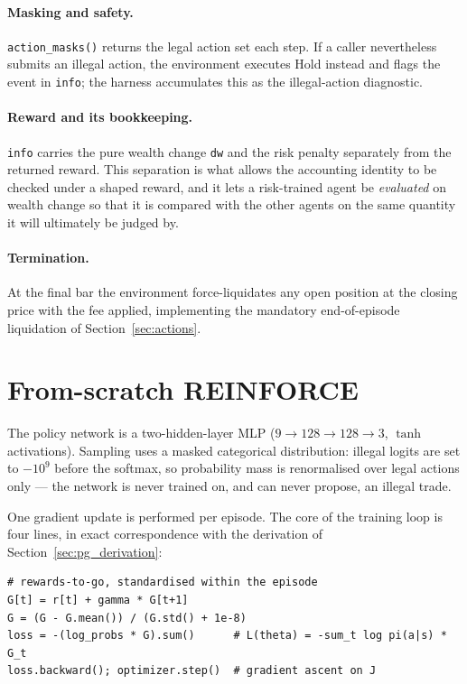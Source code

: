 \paragraph{Masking and safety.} \texttt{action\_masks()} returns the legal
action set each step. If a caller nevertheless submits an illegal action,
the environment executes Hold instead and flags the event in \texttt{info};
the harness accumulates this as the illegal-action diagnostic.

\paragraph{Reward and its bookkeeping.} \texttt{info} carries the pure
wealth change \texttt{dw} and the risk penalty separately from the returned
reward. This separation is what allows the accounting identity to be
checked under a shaped reward, and it lets a risk-trained agent be
\emph{evaluated} on wealth change so that it is compared with the other
agents on the same quantity it will ultimately be judged by.

\paragraph{Termination.} At the final bar the environment force-liquidates
any open position at the closing price with the fee applied, implementing
the mandatory end-of-episode liquidation of Section~\ref{sec:actions}.

\section{From-scratch REINFORCE}
\label{sec:impl_reinforce}

The policy network is a two-hidden-layer MLP
($9 \to 128 \to 128 \to 3$, $\tanh$ activations). Sampling uses a masked
categorical distribution: illegal logits are set to $-10^9$ before the
softmax, so probability mass is renormalised over legal actions only ---
the network is never trained on, and can never propose, an illegal trade.

One gradient update is performed per episode. The core of the training
loop is four lines, in exact correspondence with the derivation of
Section~\ref{sec:pg_derivation}:

\begin{verbatim}
# rewards-to-go, standardised within the episode
G[t] = r[t] + gamma * G[t+1]
G = (G - G.mean()) / (G.std() + 1e-8)
loss = -(log_probs * G).sum()      # L(theta) = -sum_t log pi(a|s) * G_t
loss.backward(); optimizer.step()  # gradient ascent on J
\end{verbatim}

